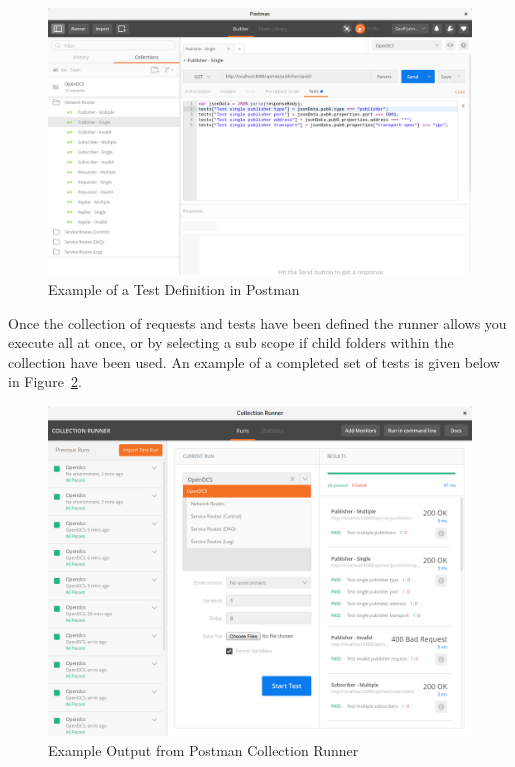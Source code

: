     \begin{figure}[H]
      \includegraphics[width=\textwidth]{figures/testing/postman-test-definition}
      \caption{Example of a Test Definition in Postman}
      \label{fig:test-postman-def}
    \end{figure}

    Once the collection of requests and tests have been defined the runner
    allows you execute all at once, or by selecting a sub scope if child
    folders within the collection have been used. An example of a completed set
    of tests is given below in Figure~\ref{fig:test-postman-runner}.

    \begin{figure}[H]
      \includegraphics[width=\textwidth]{figures/testing/postman-sample-run}
      \caption{Example Output from Postman Collection Runner}
      \label{fig:test-postman-runner}
    \end{figure}

